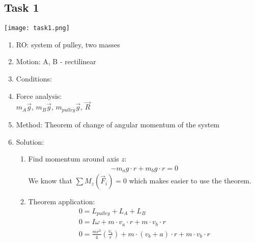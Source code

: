 \subsection*{Task 1}

\texttt{[image: task1.png]}

\begin{enumerate}
    \item RO: system of pulley, two masses
    \item Motion: A, B - rectilinear
    \item Conditions: \\
    \item Force analysis: \\
          $m_A\vec{g}$, $m_B\vec{g}$, $m_{pulley}\vec{g}$, $\vec{R}$
    \item Method: Theorem of change of angular momentum of the system
    \item Solution:
          \begin{enumerate}
              \item Find momentum around axis $z$:
                    \begin{align}
                        -m_ag \cdot r + m_bg \cdot r = 0
                    \end{align}
                    We know that $\sum M_z(\vec{F}_i) = 0$ which makes easier to use the theorem.
              \item Theorem application:
                    \begin{align}
                        0 = L_{pulley} + L_{A} + L_{B} \\
                        0 = I\omega + m \cdot v_a \cdot r + m \cdot v_b \cdot r \\
                        0 = \frac{m r^2}{4}(\frac{v_b}{r}) + m \cdot (v_b + a) \cdot r + m \cdot v_b \cdot r
                    \end{align}


\end{enumerate}
\end{enumerate}
